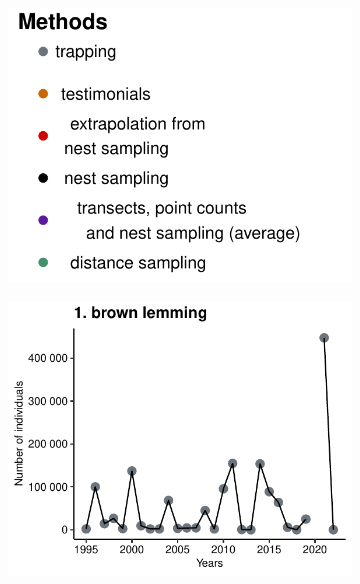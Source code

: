 \documentclass[a4paper,twoside,10pt]{article}
\begin{document}
\begin{figure}[h]
  \centering
  \begin{subfigure}{0.35\textwidth}
    \includegraphics[width=\linewidth]{figures/species_temporal_series/legend.pdf}
  \end{subfigure} 
  \begin{subfigure}{0.40\textwidth}
    \includegraphics[width=\linewidth]{figures/species_temporal_series/brown_lemming.pdf}
  \end{subfigure}
    \hfill
    \hfill
  \begin{subfigure}{0.45\textwidth}

\end{subfigure}
\end{figure}
\end{document}
